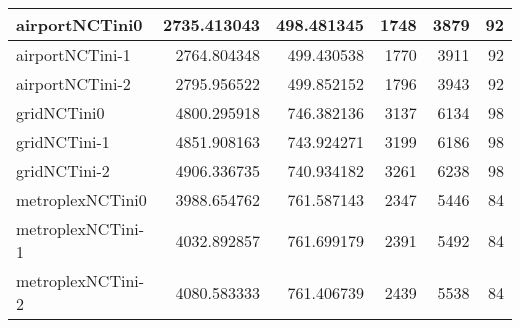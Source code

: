 \documentclass[../../../thesis.tex]{subfiles}
\begin{document}
\begin{longtable}{|l|r|r|r|r|r|}
airportNCTini0 & 2735.413043 & 498.481345 & 1748 & 3879 & 92 \\ \hline
airportNCTini-1 & 2764.804348 & 499.430538 & 1770 & 3911 & 92 \\ \hline
airportNCTini-2 & 2795.956522 & 499.852152 & 1796 & 3943 & 92 \\ \hline
gridNCTini0 & 4800.295918 & 746.382136 & 3137 & 6134 & 98 \\ \hline
gridNCTini-1 & 4851.908163 & 743.924271 & 3199 & 6186 & 98 \\ \hline
gridNCTini-2 & 4906.336735 & 740.934182 & 3261 & 6238 & 98 \\ \hline
metroplexNCTini0 & 3988.654762 & 761.587143 & 2347 & 5446 & 84 \\ \hline
metroplexNCTini-1 & 4032.892857 & 761.699179 & 2391 & 5492 & 84 \\ \hline
metroplexNCTini-2 & 4080.583333 & 761.406739 & 2439 & 5538 & 84 \\ \hline
\end{longtable}
\fi
\end{document}
